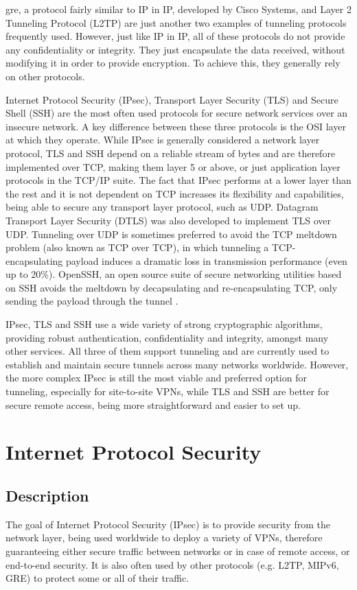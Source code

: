 \documentclass[a4paper,12pt]{report}
\begin{document}
		\acrfull{gre}, a protocol fairly similar to IP in IP, developed by Cisco Systems, and Layer 2 Tunneling Protocol (L2TP) are just another two examples of tunneling protocols frequently used. However, just like IP in IP, all of these protocols do not provide any confidentiality or integrity. They just encapsulate the data received, without modifying it in order to provide encryption. To achieve this, they generally rely on other protocols.
		
		Internet Protocol Security (IPsec), Transport Layer Security (TLS) and Secure Shell (SSH) are the most often used protocols for secure network services over an insecure network. A key difference between these three protocols is the OSI layer at which they operate. While IPsec is generally considered a network layer protocol, TLS and SSH depend on a reliable stream of bytes and are therefore implemented over TCP, making them layer 5 or above, or just application layer protocols in the TCP/IP suite. The fact that IPsec performs at a lower layer than the rest and it is not dependent on TCP increases its flexibility and capabilities, being able to secure any transport layer protocol, such as UDP. Datagram Transport Layer Security (DTLS) was also developed to implement TLS over UDP. Tunneling over UDP is sometimes preferred to avoid the TCP meltdown problem (also known as TCP over TCP), in which tunneling a TCP-encapsulating payload induces a dramatic loss in transmission performance (even up to 20\%)\cite{tcpmeltdown}. OpenSSH, an open source suite of secure networking utilities based on SSH avoids the meltdown by decapsulating and re-encapsulating TCP, only sending the payload through the tunnel \cite{opensshmeltdown}.
		
		IPsec, TLS and SSH use a wide variety of strong cryptographic algorithms, providing robust authentication, confidentiality and integrity, amongst many other services. All three of them support tunneling and are currently used to establish and maintain secure tunnels across many networks worldwide. However, the more complex IPsec is still the most viable and preferred option for tunneling, especially for site-to-site VPNs, while TLS and SSH are better for secure remote access, being more straightforward and easier to set up.
		
	\chapter{Internet Protocol Security}
	\section{Description }
		The goal of Internet Protocol Security (IPsec) is to provide security from the network layer, being used worldwide to deploy a variety of VPNs, therefore guaranteeing either secure traffic between networks or in case of remote access, or end-to-end security. It is also often used by other protocols (e.g. L2TP, MIPv6, GRE) to protect some or all of their traffic.
		
\end{document}
